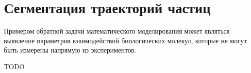 \section*{Сегментация траекторий частиц}

Примером обратной задачи математического моделирования
может являться выявление параметров взаимодействий биологических молекул,
которые не могут быть измерены напрямую из экспериментов.

TODO

